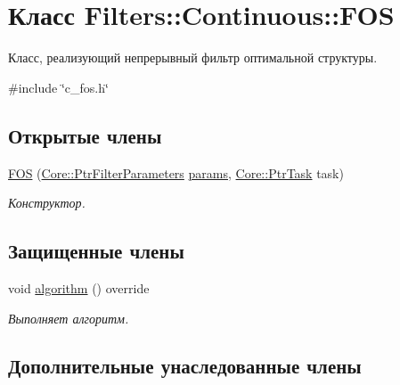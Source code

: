 \hypertarget{class_filters_1_1_continuous_1_1_f_o_s}{}\section{Класс Filters\+:\+:Continuous\+:\+:F\+OS}
\label{class_filters_1_1_continuous_1_1_f_o_s}


Класс, реализующий непрерывный фильтр оптимальной структуры.  




{\ttfamily \#include \char`\"{}c\+\_\+fos.\+h\char`\"{}}

\subsection*{Открытые члены}
\begin{DoxyCompactItemize}
\item 
\hyperlink{class_filters_1_1_continuous_1_1_f_o_s_a37bf6963e1fc25a0a709d53299fc2951}{F\+OS} (\hyperlink{namespace_core_a4811af8148ba137d644b9a61a042cf03}{Core\+::\+Ptr\+Filter\+Parameters} \hyperlink{class_core_1_1_filter_a44aa749b49ba46256975ce545531ecf7}{params}, \hyperlink{namespace_core_abfda8f69fcacfcea2696549b548ed737}{Core\+::\+Ptr\+Task} task)\hypertarget{class_filters_1_1_continuous_1_1_f_o_s_a37bf6963e1fc25a0a709d53299fc2951}{}\label{class_filters_1_1_continuous_1_1_f_o_s_a37bf6963e1fc25a0a709d53299fc2951}

\begin{DoxyCompactList}\small\item\em Конструктор. \end{DoxyCompactList}\end{DoxyCompactItemize}
\subsection*{Защищенные члены}
\begin{DoxyCompactItemize}
\item 
void \hyperlink{class_filters_1_1_continuous_1_1_f_o_s_a6db8005b66c345d94cdd4498edad9022}{algorithm} () override
\begin{DoxyCompactList}\small\item\em Выполняет алгоритм. \end{DoxyCompactList}\end{DoxyCompactItemize}
\subsection*{Дополнительные унаследованные члены}


